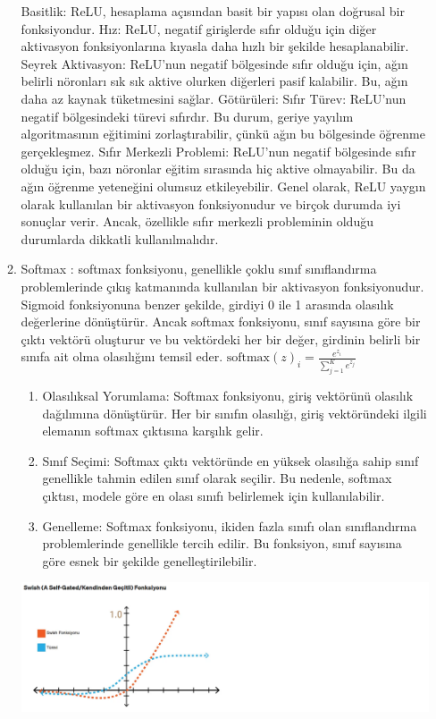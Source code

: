\documentclass[12pt,a4paper]{article}
\begin{document}
\begin{enumerate}
\begin{enumerate}
			Basitlik: ReLU, hesaplama açısından basit bir yapısı olan doğrusal bir fonksiyondur.
			Hız: ReLU, negatif girişlerde sıfır olduğu için diğer aktivasyon fonksiyonlarına kıyasla daha hızlı bir şekilde hesaplanabilir.
			Seyrek Aktivasyon: ReLU'nun negatif bölgesinde sıfır olduğu için, ağın belirli nöronları sık sık aktive olurken diğerleri pasif kalabilir. Bu, ağın daha az kaynak tüketmesini sağlar.
			\vspace{\baselineskip}
			Götürüleri:	
			Sıfır Türev: ReLU'nun negatif bölgesindeki türevi sıfırdır. Bu durum, geriye yayılım algoritmasının eğitimini zorlaştırabilir, çünkü ağın bu bölgesinde öğrenme gerçekleşmez.
			Sıfır Merkezli Problemi: ReLU'nun negatif bölgesinde sıfır olduğu için, bazı nöronlar eğitim sırasında hiç aktive olmayabilir. Bu da ağın öğrenme yeteneğini olumsuz etkileyebilir.
			Genel olarak, ReLU yaygın olarak kullanılan bir aktivasyon fonksiyonudur ve birçok durumda iyi sonuçlar verir. Ancak, özellikle sıfır merkezli probleminin olduğu durumlarda dikkatli kullanılmalıdır.
			\pagebreak
			\item Softmax :
			softmax fonksiyonu, genellikle çoklu sınıf sınıflandırma problemlerinde çıkış katmanında kullanılan bir aktivasyon fonksiyonudur. Sigmoid fonksiyonuna benzer şekilde, girdiyi 0 ile 1 arasında olasılık değerlerine dönüştürür. Ancak softmax fonksiyonu, sınıf sayısına göre bir çıktı vektörü oluşturur ve bu vektördeki her bir değer, girdinin belirli bir sınıfa ait olma olasılığını temsil eder.
			\vspace{\baselineskip}
			$\text{softmax}(z)_i = \frac{e^{z_i}}{\sum_{j=1}^{K} e^{z_j}}$
			\begin{enumerate}
				\item Olasılıksal Yorumlama: Softmax fonksiyonu, giriş vektörünü olasılık dağılımına dönüştürür. Her bir sınıfın olasılığı, giriş vektöründeki ilgili elemanın softmax çıktısına karşılık gelir.
				\item Sınıf Seçimi: Softmax çıktı vektöründe en yüksek olasılığa sahip sınıf genellikle tahmin edilen sınıf olarak seçilir. Bu nedenle, softmax çıktısı, modele göre en olası sınıfı belirlemek için kullanılabilir.
				\item Genelleme: Softmax fonksiyonu, ikiden fazla sınıfı olan sınıflandırma problemlerinde genellikle tercih edilir. Bu fonksiyon, sınıf sayısına göre esnek bir şekilde genelleştirilebilir.
			\end{enumerate}
			
			\begin{minipage}{0.45\textwidth}
				\centering
				\includegraphics[height=0.5\textheight]{softmax.png}
			\end{minipage}
			

\end{enumerate}
\end{enumerate}
\end{document}
